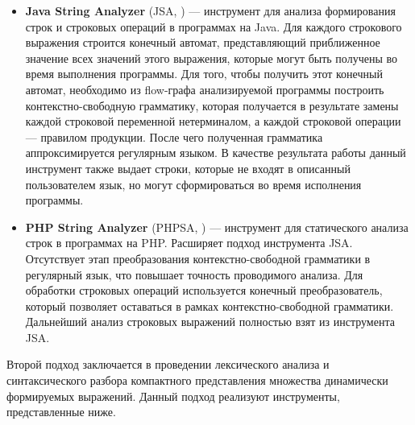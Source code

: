 \begin{itemize}
\item \textbf{Java String Analyzer} (JSA, \cite{JSA1, JSAUrl}) {---}  инструмент для анализа формирования строк и строковых операций в программах на Java. Для каждого строкового выражения строится конечный автомат, представляющий приближенное значение всех значений этого выражения, которые могут быть получены во время выполнения программы. Для того, чтобы получить этот конечный автомат, необходимо из flow-графа анализируемой программы построить контекстно-свободную грамматику, которая получается в результате замены каждой строковой переменной нетерминалом, а каждой строковой операции {---} правилом продукции. После чего полученная грамматика аппроксимируется регулярным языком. В качестве результата работы данный инструмент также выдает строки, которые не входят в описанный пользователем язык, но могут сформироваться во время исполнения программы. 

\item \textbf{PHP String Analyzer} (PHPSA, \cite{PHPSA, PHPSAUrl}) {---} инструмент для статического анализа строк в программах на PHP. Расширяет подход инструмента JSA. Отсутствует этап преобразования контекстно-свободной грамматики в регулярный язык, что повышает точность проводимого анализа. Для обработки строковых операций используется конечный преобразователь, который позволяет оставаться в рамках контекстно-свободной грамматики. Дальнейший анализ строковых выражений полностью взят из инструмента JSA.
\end{itemize} 

Второй подход заключается в проведении лексического анализа и синтаксического разбора компактного представления множества динамически формируемых выражений. Данный подход реализуют инструменты, представленные ниже.

